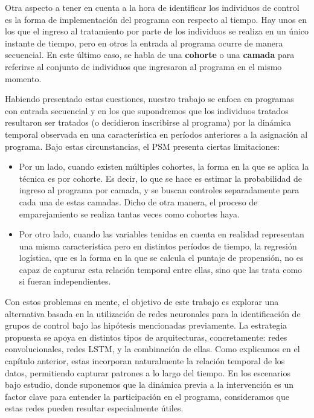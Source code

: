 \documentclass[../main.tex]{subfiles}
\begin{document}
Otra aspecto a tener en cuenta a la hora de identificar los individuos de control es la
forma de implementación del programa con respecto al tiempo. Hay unos en los que el
ingreso al tratamiento por parte de los individuos se realiza en un único instante de
tiempo, pero en otros la entrada al programa ocurre de manera secuencial. En este último
caso, se habla de una \textbf{cohorte} o una \textbf{camada} para referirse al conjunto de
individuos que ingresaron al programa en el mismo momento.

Habiendo presentado estas cuestiones, nuestro trabajo se enfoca en programas con entrada
secuencial y en los que supondremos que los individuos tratados resultaron ser tratados (o
decidieron inscribirse al programa) por la dinámica temporal observada en una
característica en períodos anteriores a la asignación al programa. Bajo estas
circunstancias, el PSM presenta ciertas limitaciones:
\begin{itemize}
    \item Por un lado, cuando existen múltiples cohortes, la forma en la que se aplica la
    técnica es por cohorte. Es decir, lo que se hace es estimar la probabilidad de ingreso
    al programa por camada, y se buscan controles separadamente para cada una de estas
    camadas. Dicho de otra manera, el proceso de emparejamiento se realiza tantas veces
    como cohortes haya.
    \item Por otro lado, cuando las variables tenidas en cuenta en realidad representan
    una misma característica pero en distintos períodos de tiempo, la regresión logística,
    que es la forma en la que se calcula el puntaje de propensión, no es capaz de capturar
    esta relación temporal entre ellas, sino que las trata como si fueran independientes.
\end{itemize}

Con estos problemas en mente, el objetivo de este trabajo es explorar una alternativa
basada en la utilización de redes neuronales para la identificación de grupos de control
bajo las hipótesis mencionadas previamente. La estrategia propuesta se apoya en distintos
tipos de arquitecturas, concretamente: redes convolucionales, redes LSTM, y la combinación
de ellas. Como explicamos en el capítulo anterior, estas incorporan naturalmente la
relación temporal de los datos, permitiendo capturar patrones a lo largo del tiempo. En
los escenarios bajo estudio, donde suponemos que la dinámica previa a la intervención es
un factor clave para entender la participación en el programa, consideramos que estas
redes pueden resultar especialmente útiles.
\end{document}
